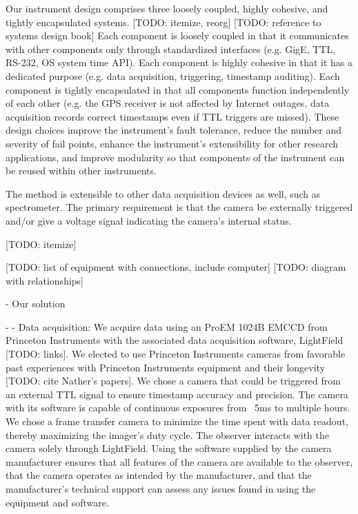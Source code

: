 \documentclass[preprint2]{aastex}
\begin{document}
Our instrument design comprises three loosely coupled, highly cohesive, and tightly encapsulated systems. [TODO: itemize, reorg] [TODO: reference to systems design book] Each component is loosely coupled in that it communicates with other components only through standardized interfaces (e.g. GigE, TTL, RS-232, OS system time API). Each component is highly cohesive in that it has a dedicated purpose (e.g. data acquisition, triggering, timestamp auditing). Each component is tightly encapsulated in that all components function independently of each other (e.g. the GPS receiver is not affected by Internet outages, data acquisition records correct timestamps even if TTL triggers are missed).  These design choices improve the instrument's fault tolerance, reduce the number and severity of fail points, enhance the instrument's extensibility for other research applications, and improve modularity so that components of the instrument can be reused within other instruments.

The method is extensible to other data acquisition devices as well, such as spectrometer. The primary requirement is that the camera be externally triggered and/or give a voltage signal indicating the camera's internal status. 

[TODO: itemize]

[TODO: list of equipment with connections, include computer] [TODO: diagram with relationships]

- Our solution

- - Data acquisition: We acquire data using an ProEM 1024B EMCCD from Princeton Instruments with the associated data acquisition software, LightField [TODO: links]. We elected to use Princeton Instruments cameras from favorable past experiences with Princeton Instruments equipment and their longevity [TODO: cite Nather's papers]. We chose a camera that could be triggered from an external TTL signal to ensure timestamp accuracy and precision. The camera with its software is capable of continuous exposures from ~5ms to multiple hours. We chose a frame transfer camera to minimize the time spent with data readout, thereby maximizing the imager's duty cycle. The observer interacts with the camera solely through LightField. Using the software supplied by the camera manufacturer ensures that all features of the camera are available to the observer, that the camera operates as intended by the manufacturer, and that the manufacturer's technical support can assess any issues found in using the equipment and software.
\end{document}

